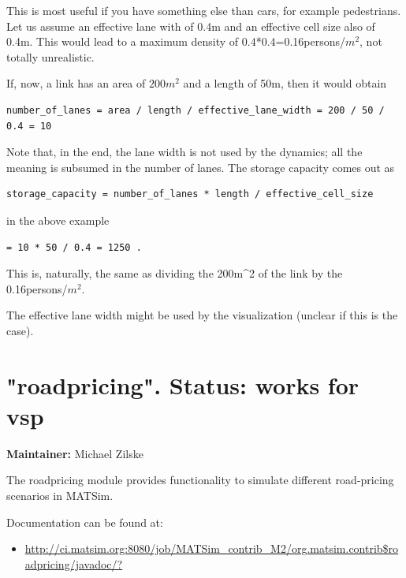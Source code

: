 This is most useful if you have something else than  cars, for example pedestrians. Let us assume an effective lane  with of 0.4m and an effective cell size also of 0.4m. This would  lead to a maximum density of 0.4*0.4=0.16persons/$m^2$, not totally  unrealistic.

If, now, a link has an area of $200m^2$ and a length of 50m, then it would obtain
\begin{verbatim}
number_of_lanes = area / length / effective_lane_width = 200 / 50 / 0.4 = 10

\end{verbatim}

Note that, in the end, the lane width is not used by the  dynamics; all the meaning is subsumed in the number of lanes. The  storage capacity comes out as
\begin{verbatim}
storage_capacity = number_of_lanes * length / effective_cell_size

\end{verbatim}

in the above example
\begin{verbatim}
= 10 * 50 / 0.4 = 1250 .

\end{verbatim}

This is, naturally, the same as dividing the 200m\textasciicircum2 of the link by the 0.16persons/$m^2$.

The effective lane width might be used by the visualization (unclear if this is the case).

\vfill\eject
\section{"roadpricing".  Status: works for vsp}

\textbf{Maintainer:} Michael Zilske

The roadpricing module provides functionality to simulate different road-pricing scenarios in MATSim.

Documentation can be found at:
\begin{itemize}
	\item \href{http://ci.matsim.org:8080/job/MATSim_contrib_M2/org.matsim.contrib$roadpricing/javadoc/?}{http://ci.matsim.org:8080/job/MATSim\_contrib\_M2/org.matsim.contrib\$roadpricing/javadoc/?}
\end{itemize}

